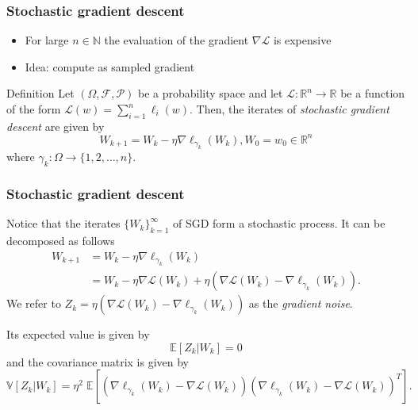 \documentclass[17pt,institute=e10]{tuhh_presentation}
\newcommand{\R}{\mathbb{R}}
\newcommand{\Lo}{\mathcal{L} : \R^n \rightarrow \R}
\newcommand{\CL}{\mathcal{L}}
\newcommand{\E}[1]{\mathbb{E}\left[{#1} \right]}
\newcommand{\V}[1]{\mathbb{V}\left[{#1} \right]}
\begin{document}
\begin{frame}[fragile]
  \frametitle{Stochastic gradient descent}
  \begin{itemize}
    \item For large $n \in \mathbb{N}$ the evaluation of the gradient $\nabla \CL$ is expensive
    \item Idea: compute as sampled gradient
  \end{itemize}
  \begin{block}{Definition}
    Let $(\Omega, \mathcal{F}, \mathcal{P})$ be a probability space and let $\Lo$ be a function of the form $\CL (w) = \sum_{i=1}^n \ell_i(w)$.
    Then, the iterates of \emph{stochastic gradient descent} are given by
    \begin{equation*}
      W_{k+1} = W_k - \eta \nabla \ell_{\gamma_k} (W_k), W_0 = w_0 \in \mathbb{R}^n
    \end{equation*}
    where $\gamma_k : \Omega \rightarrow \{1,2,\dots,n\}$. 
  \end{block}
  
\end{frame}

\begin{frame}[fragile]
  \frametitle{Stochastic gradient descent}
  Notice that the iterates $\{W_k\}_{k=1}^\infty$ of SGD form a stochastic process.
  It can be decomposed as follows
  \begin{align*}
    W_{k+1} &= W_k - \eta \nabla \ell_{\gamma_k} (W_k) \\
    &= W_k - \eta \nabla \CL(W_k) + \eta \left(\nabla \CL(W_k) - \nabla \ell_{\gamma_k} (W_k) \right).
  \end{align*}
  We refer to $Z_k = \eta \left(\nabla \CL(W_k) - \nabla \ell_{\gamma_k} (W_k) \right)$ as the \emph{\textcolor{purple-pontifex}{gradient noise}}.

  Its expected value is given by
  \begin{equation*}
    \E{Z_k|W_k} = 0
  \end{equation*}
  and the \textcolor{purple-pontifex}{covariance matrix} is given by
  \begin{equation*}
    \V{Z_k|W_k} = \eta^2 \; \E{\left(\nabla \ell_{\gamma_k}(W_k) - \nabla \CL(W_k)\right)\left(\nabla \ell_{\gamma_k}(W_k) - \nabla \CL(W_k)\right)^T}.
  \end{equation*}
  
\end{frame}
\end{document}
